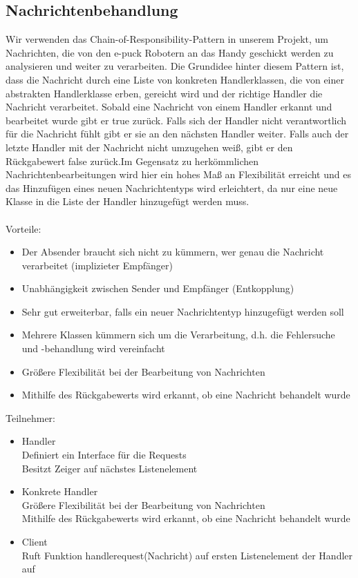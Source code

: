 \documentclass[10pt,a4paper]{article}
\begin{document}
  		\subsection{Nachrichtenbehandlung}
  			Wir verwenden das Chain-of-Responsibility-Pattern in unserem Projekt, um Nachrichten, die von den e-puck Robotern an das Handy
  			geschickt werden zu analysieren und weiter zu verarbeiten. Die Grundidee hinter diesem Pattern ist, dass die Nachricht durch eine Liste
  			von konkreten Handlerklassen, die von einer abstrakten Handlerklasse erben, gereicht wird und der richtige Handler die Nachricht
  			verarbeitet. Sobald eine Nachricht von einem Handler erkannt und bearbeitet wurde gibt er true zurück. Falls sich der Handler nicht
  			verantwortlich für die Nachricht fühlt gibt er sie an den nächsten Handler weiter. Falls auch der letzte Handler mit der Nachricht nicht
  			umzugehen weiß, gibt er den Rückgabewert false zurück.Im Gegensatz zu herkömmlichen Nachrichtenbearbeitungen wird hier ein
  			hohes Maß an Flexibilität erreicht und es das Hinzufügen eines neuen Nachrichtentyps wird erleichtert, da nur eine neue Klasse in die
  			Liste der Handler hinzugefügt werden muss. \\ \\
  			Vorteile:
  			\begin{itemize}
  				\item Der Absender braucht sich nicht zu kümmern, wer genau die Nachricht verarbeitet (implizieter Empfänger)
  				\item Unabhängigkeit zwischen Sender und Empfänger (Entkopplung)
  				\item Sehr gut erweiterbar, falls ein neuer Nachrichtentyp hinzugefügt werden soll
  				\item Mehrere Klassen kümmern sich um die Verarbeitung, d.h. die Fehlersuche und -behandlung wird vereinfacht
  				\item Größere Flexibilität bei der Bearbeitung von Nachrichten
  				\item Mithilfe des Rückgabewerts wird erkannt, ob eine Nachricht behandelt wurde
  			\end{itemize}  
  			Teilnehmer:
   			\begin{itemize}
  				\item Handler\\Definiert ein Interface für die Requests\\Besitzt Zeiger auf nächstes Listenelement
  				\item Konkrete Handler\\Größere Flexibilität bei der Bearbeitung von Nachrichten\\
  					Mithilfe des Rückgabewerts wird erkannt, ob eine Nachricht behandelt wurde
  				\item Client \\ Ruft Funktion handlerequest(Nachricht) auf ersten Listenelement der Handler auf
  			\end{itemize}   	
\end{document}
